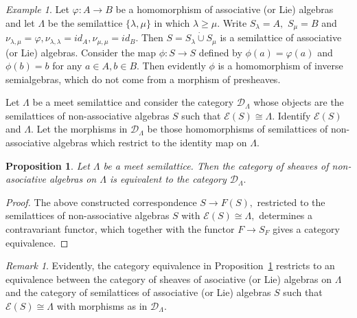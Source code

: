 \documentclass{amsart}
\newcommand{\E}{\mathcal{E}}
\newcommand{\0}{{\vartheta}}
\newtheorem{prop}[thm]{Proposition}
\theoremstyle{definition}
\theoremstyle{remark}
\newtheorem{rem}[thm]{Remark}
\newtheorem{ex}[thm]{Example}
\numberwithin{equation}{section}
\newtheorem*{Theorem A}{\textbf{Theorem A}}
\newtheorem*{Corollary E}{\textbf{Corollary E}}
\newtheorem*{Corollary F}{\textbf{Corollary F}}
\newtheorem*{Theorem B}{\textbf{Theorem B}}
\newtheorem*{Theorem C}{\textbf{Theorem C}}
\newtheorem*{Theorem D}{\textbf{Theorem B}}
\newtheorem*{p a}{\textbf{Proof of  Theorem A}}
\newtheorem*{p b}{\textbf{Proof of Theorem B}}
\newtheorem*{p c}{\textbf{Proof of  Theorem C}}
\newtheorem*{p d}{\textbf{Proof of  Theorem D}}
\begin{document}
\begin{ex} Let $\varphi : A \to B$ be a homomorphism of associative (or Lie) algebras and let $\Lambda $ be the semilattice 
$\{ \lambda, \mu \} $ in which  $ \lambda \geq \mu  $. Write $S_{\lambda} = A,$  $S_{\mu} = B$ and
$\nu _{\lambda, \mu} = \varphi ,  \nu _{\lambda, \lambda } = id _A, \nu _{\mu, \mu} = id _B.$ Then
$S= S_{\lambda} \dot{\cup} S_{\mu}$  is a semilattice of  associative (or Lie) algebras. Consider the map 
$\phi : S \to S$ defined by $\phi (a) = \varphi (a)$ and
$\phi (b) =b$  for any $a\in A, b\in B$. Then evidently
$\phi$ is a homomorphism of inverse semialgebras, which do not come from a morphism of presheaves.
 \end{ex}
 
 Let $\Lambda $ be a meet semilattice and consider the  category   $\mathcal D _{\Lambda}$  whose objects are the semilattices of non-associative algebras $S$ such that $\E (S) \cong \Lambda $. Identify  $\E (S)$ and $\Lambda $. Let the morphisms in $\mathcal D _{\Lambda}$  be those  homomorphisms of  semilattices of non-associative  algebras which restrict to the identity map on $\Lambda $.
 
 
 

\begin{prop}\label{prop:CategoryEquiv} Let $\Lambda $ be a meet semilattice.
    Then the category of sheaves of non-asociative algebras on $\Lambda $  is equivalent to the category
    $\mathcal D _{\Lambda}.$
\end{prop}
\begin{proof} The above constructed correspondence $S\to F(S),$ restricted to the
semilattices of non-associative algebras $S$ with $\E (S) \cong \Lambda ,$ determines a contravariant functor, which  together with the functor  $F\to S_F$  gives a category equivalence.
\end{proof}

\begin{rem} Evidently, the category equivalence in Proposition~\ref{prop:CategoryEquiv} restricts to an equivalence between the category of sheaves of asociative
    (or Lie)  algebras on $\Lambda $  and the category of semilattices of associative (or Lie) algebras $S$ such that $\E (S) \cong \Lambda $ with morphisms as in $\mathcal D _{\Lambda}.$ 
\end{rem}
\end{document}
